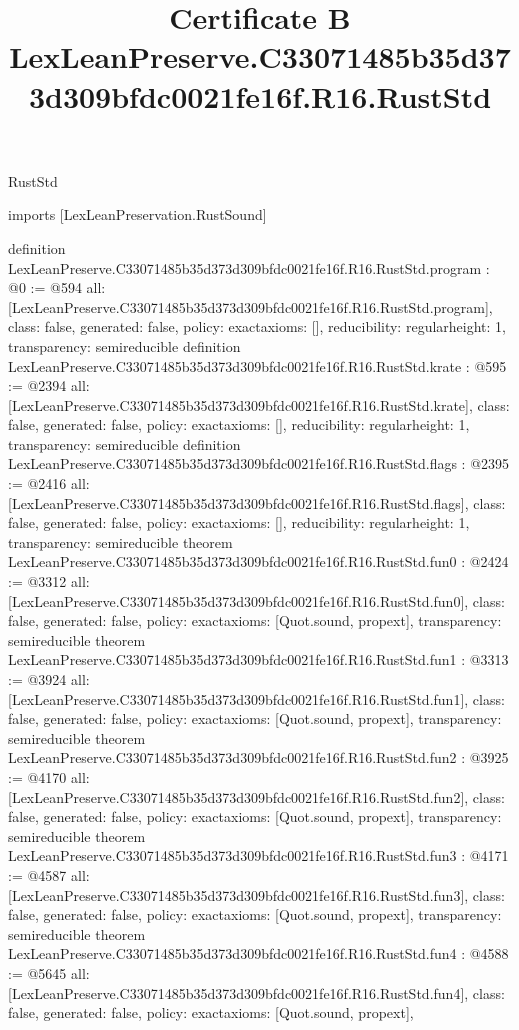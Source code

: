 \begin{lexlean}{RustStd}
\title{Certificate B LexLeanPreserve.C33071485b35d373d309bfdc0021fe16f.R16.RustStd}
\begin{coremodule}
imports [LexLeanPreservation.RustSound]

definition LexLeanPreserve.C33071485b35d373d309bfdc0021fe16f.R16.RustStd.program : @0 := @594 {
  all: [LexLeanPreserve.C33071485b35d373d309bfdc0021fe16f.R16.RustStd.program],
  class: false,
  generated: false,
  policy: exact{axioms: []},
  reducibility: regular{height: 1},
  transparency: semireducible
}
definition LexLeanPreserve.C33071485b35d373d309bfdc0021fe16f.R16.RustStd.krate : @595 := @2394 {
  all: [LexLeanPreserve.C33071485b35d373d309bfdc0021fe16f.R16.RustStd.krate],
  class: false,
  generated: false,
  policy: exact{axioms: []},
  reducibility: regular{height: 1},
  transparency: semireducible
}
definition LexLeanPreserve.C33071485b35d373d309bfdc0021fe16f.R16.RustStd.flags : @2395 := @2416 {
  all: [LexLeanPreserve.C33071485b35d373d309bfdc0021fe16f.R16.RustStd.flags],
  class: false,
  generated: false,
  policy: exact{axioms: []},
  reducibility: regular{height: 1},
  transparency: semireducible
}
theorem LexLeanPreserve.C33071485b35d373d309bfdc0021fe16f.R16.RustStd.fun0 : @2424 := @3312 {
  all: [LexLeanPreserve.C33071485b35d373d309bfdc0021fe16f.R16.RustStd.fun0],
  class: false,
  generated: false,
  policy: exact{axioms: [Quot.sound, propext]},
  transparency: semireducible
}
theorem LexLeanPreserve.C33071485b35d373d309bfdc0021fe16f.R16.RustStd.fun1 : @3313 := @3924 {
  all: [LexLeanPreserve.C33071485b35d373d309bfdc0021fe16f.R16.RustStd.fun1],
  class: false,
  generated: false,
  policy: exact{axioms: [Quot.sound, propext]},
  transparency: semireducible
}
theorem LexLeanPreserve.C33071485b35d373d309bfdc0021fe16f.R16.RustStd.fun2 : @3925 := @4170 {
  all: [LexLeanPreserve.C33071485b35d373d309bfdc0021fe16f.R16.RustStd.fun2],
  class: false,
  generated: false,
  policy: exact{axioms: [Quot.sound, propext]},
  transparency: semireducible
}
theorem LexLeanPreserve.C33071485b35d373d309bfdc0021fe16f.R16.RustStd.fun3 : @4171 := @4587 {
  all: [LexLeanPreserve.C33071485b35d373d309bfdc0021fe16f.R16.RustStd.fun3],
  class: false,
  generated: false,
  policy: exact{axioms: [Quot.sound, propext]},
  transparency: semireducible
}
theorem LexLeanPreserve.C33071485b35d373d309bfdc0021fe16f.R16.RustStd.fun4 : @4588 := @5645 {
  all: [LexLeanPreserve.C33071485b35d373d309bfdc0021fe16f.R16.RustStd.fun4],
  class: false,
  generated: false,
  policy: exact{axioms: [Quot.sound, propext]},
}
\end{coremodule}
\end{lexlean}
